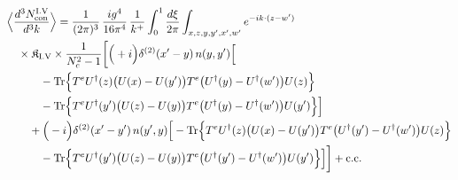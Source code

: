 \begingroup\small
\begin{align}\label{eq:S-I.V-2}
&\Big\langle\frac{d^{3}N^{\rm I.V}_{{\rm con}}}{d^{3}k}\Big\rangle=\frac{1}{(2\pi)^{3}}\, \frac{ig^{4}}{16\pi^{4}}\, \frac{1}{k^{+}} \int_{0}^{1}\frac{d\xi}{2\pi} \int_{x,z,y,y',x',w'}e^{-ik\cdot(z-w')}\notag\\
&\quad \times \mathfrak{K}_{\rm I.V} \times \frac{1}{N_{c}^{2}-1}\bigg[\Big(+i\Big)\delta^{(2)}(x'-y)\, n(y,y')\Big[\notag\\
&\quad\quad\quad -{\rm Tr}\Big\{T^{e}U^{\dagger}(z)\big(U(x)-U(y')\big)T^{e}\big(U^{\dagger}(y)-U^{\dagger}(w')\big)U(z)\Big\}\notag\\
&\quad\quad\quad -{\rm Tr}\Big\{T^{e}U^{\dagger}(y')\big(U(z)-U(y)\big)T^{e}\big(U^{\dagger}(y)-U^{\dagger}(w')\big)U(y')\Big\}\Big]\notag\\
&\quad\quad +\Big(-i\Big)\delta^{(2)}(x'-y')\, n(y',y)\Big[ -{\rm Tr}\Big\{T^{e}U^{\dagger}(z)\big(U(x)-U(y')\big)T^{e}\big(U^{\dagger}(y')-U^{\dagger}(w')\big)U(z)\Big\}\notag\\
&\quad\quad\quad -{\rm Tr}\Big\{T^{e}U^{\dagger}(y')\big(U(z)-U(y)\big)T^{e}\big(U^{\dagger}(y')-U^{\dagger}(w')\big)U(y')\Big\}\Big]\bigg] +{\rm c.c.}
\end{align}
\endgroup
